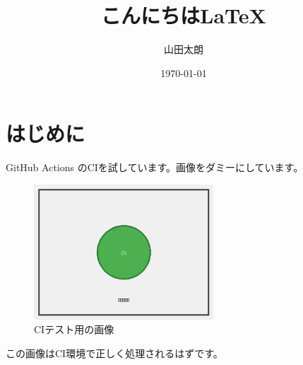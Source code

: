 \documentclass[uplatex]{jsarticle}
\title{こんにちは\LaTeX}
\author{山田太朗}
\date{\today}
\begin{document}
\maketitle

\section{はじめに}

GitHub Actions のCIを試しています。画像をダミーにしています。

\begin{figure}[htbp]
	\centering
	\includegraphics[width=0.6\textwidth]{figures/test-image.png}
	\caption{CIテスト用の画像}
	\label{fig:test-image}
\end{figure}

この画像はCI環境で正しく処理されるはずです。\cite{fujita2020}



\end{document}
